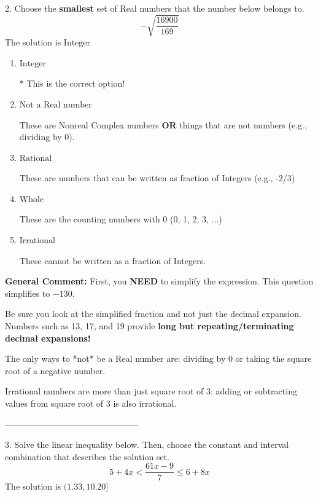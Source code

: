 \documentclass{extbook}[14pt]
\begin{document}
2. Choose the \textbf{smallest} set of Real numbers that the number below belongs to.
\[ -\sqrt{\frac{16900}{169}} \] 
The solution is $ \text{Integer} $ 

\begin{enumerate}[label=\Alph*.] 
\item $ \text{Integer} $ 

 * This is the correct option! 
\item $ \text{Not a Real number} $ 

 These are Nonreal Complex numbers \textbf{OR} things that are not numbers (e.g., dividing by 0). 
\item $ \text{Rational} $ 

 These are numbers that can be written as fraction of Integers (e.g., -2/3) 
\item $ \text{Whole} $ 

 These are the counting numbers with 0 (0, 1, 2, 3, ...) 
\item $ \text{Irrational} $ 

 These cannot be written as a fraction of Integers. 
\end{enumerate} 
 
\textbf{General Comment:} First, you \textbf{NEED} to simplify the expression. This question simplifies to $-130$. 
 
 Be sure you look at the simplified fraction and not just the decimal expansion. Numbers such as 13, 17, and 19 provide \textbf{long but repeating/terminating decimal expansions!} 
 
 The only ways to *not* be a Real number are: dividing by 0 or taking the square root of a negative number. 
 
 Irrational numbers are more than just square root of 3: adding or subtracting values from square root of 3 is also irrational. 

-----------------------------------------------

3. Solve the linear inequality below. Then, choose the constant and interval combination that describes the solution set.
\[ 5 + 4 x < \frac{61 x - 9}{7} \leq 6 + 8 x \] 
The solution is $ (1.33, 10.20] $ 
\end{document}

